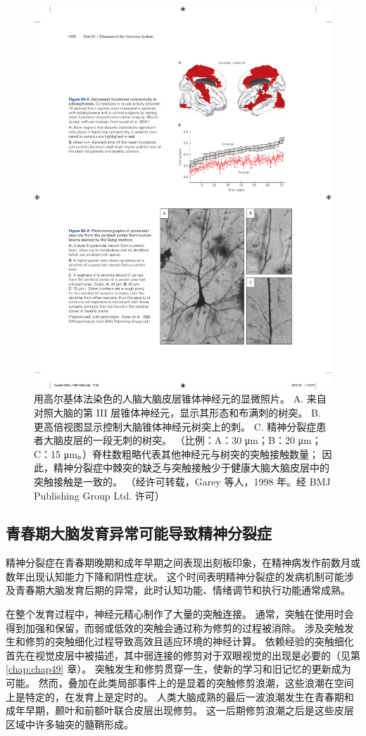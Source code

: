 \begin{figure}[htbp]
	\centering
	\includegraphics[width=0.7\linewidth]{chap60/fig_60_6}
	\caption{用高尔基体法染色的人脑大脑皮层锥体神经元的显微照片。 A. 来自对照大脑的第 III 层锥体神经元，显示其形态和布满刺的树突。 B. 更高倍视图显示控制大脑锥体神经元树突上的刺。 C. 精神分裂症患者大脑皮层的一段无刺的树突。 （比例：A：30 μm；B：20 μm；C：15 μm。）脊柱数粗略代表其他神经元与树突的突触接触数量； 因此，精神分裂症中棘突的缺乏与突触接触少于健康大脑大脑皮层中的突触接触是一致的。 （经许可转载，Garey 等人，1998 年。经 BMJ Publishing Group Ltd. 许可）}
	\label{fig:60_6}
\end{figure}

\subsection{青春期大脑发育异常可能导致精神分裂症}

精神分裂症在青春期晚期和成年早期之间表现出刻板印象，在精神病发作前数月或数年出现认知能力下降和阴性症状。 这个时间表明精神分裂症的发病机制可能涉及青春期大脑发育后期的异常，此时认知功能、情绪调节和执行功能通常成熟。

在整个发育过程中，神经元精心制作了大量的突触连接。 通常，突触在使用时会得到加强和保留，而弱或低效的突触会通过称为修剪的过程被消除。 涉及突触发生和修剪的突触细化过程导致高效且适应环境的神经计算。 依赖经验的突触细化首先在视觉皮层中被描述，其中弱连接的修剪对于双眼视觉的出现是必要的（见第 \ref{chap:chap49} 章）。 突触发生和修剪贯穿一生，使新的学习和旧记忆的更新成为可能。 然而，叠加在此类局部事件上的是显着的突触修剪浪潮，这些浪潮在空间上是特定的，在发育上是定时的。 人类大脑成熟的最后一波浪潮发生在青春期和成年早期，颞叶和前额叶联合皮层出现修剪。 这一后期修剪浪潮之后是这些皮层区域中许多轴突的髓鞘形成。

